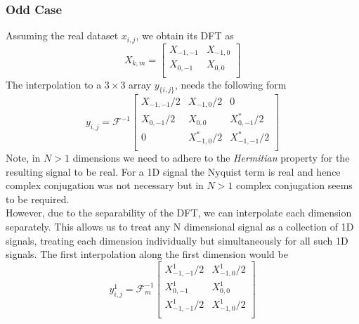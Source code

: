 \documentclass{juliacon}
\begin{document}
        \subsubsection{Odd Case}
            Assuming the real dataset $x_{i,j}$, we obtain its DFT as
            \begin{equation}
                X_{k, m} = \begin{bmatrix}
                   X_{-1, -1} &  X_{-1, 0} \\ 
                   X_{0,-1} & X_  {0, 0} \\
                \end{bmatrix}
            \end{equation}
            The interpolation to a $3\times 3$ array  $y_{\{i, j\}}$, needs the following form
            \begin{equation}
                y_{i, j} = \mathcal{F}^{-1}\begin{bmatrix}
                   X_{-1, -1}/2 &  X_{-1, 0}/2  & 0\\ 
                   X_{0,-1}/2   & X_{0, 0}      &  X_{0,-1}^*/2\\
                    0           &  X_{-1, 0}^*/2 &  X_{-1, -1}^*/2\\
                \end{bmatrix}
            \end{equation}
            Note, in $N>1$ dimensions we need to adhere to the \textit{Hermitian} property for the
            resulting signal to be real. 
            For a 1D signal the Nyquist term is real and hence complex conjugation was not necessary but in $N>1$ complex conjugation seems to be required.\\
            However, due to the separability of the DFT, we can  interpolate each dimension separately.
            This allows us to treat any N dimensional signal as a collection of 1D signals, treating each dimension individually but simultaneously for all such 1D signals.
            The first interpolation along the first dimension would be
            \begin{equation}
                y^{1}_{i, j} = \mathcal{F}_{m}^{-1}\begin{bmatrix}
                   X^1_{-1, -1}/2 &  X^1_{-1, 0}/2 \\ 
                   X^1_{0,-1} & X^1_{0, 0} \\
                   X^1_{-1,-1}/2 & X^1_{-1, 0}/2 \\
                \end{bmatrix}
            \end{equation}
\end{document}
